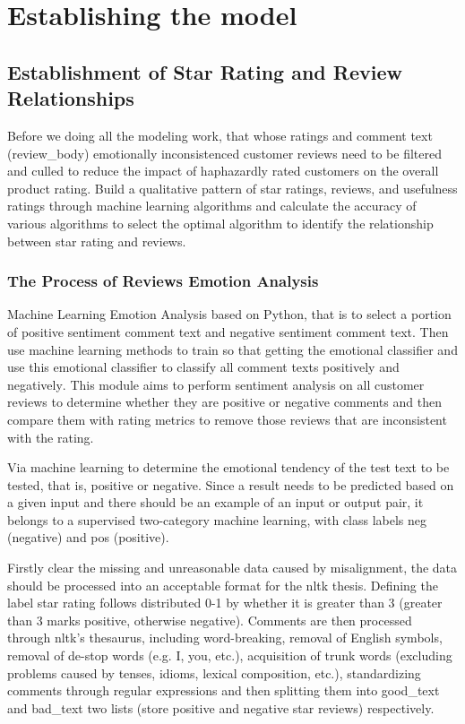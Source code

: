 \documentclass{mcmthesis}
\newcommand{\upcite}[1]{\textsuperscript{\textsuperscript{\cite{#1}}}}
\begin{document}
\section{Establishing the model}

\subsection{Establishment of Star Rating and Review Relationships}
Before we doing all the modeling work, that whose ratings and comment text (review\_body) emotionally inconsistenced customer reviews need to be filtered and culled to reduce the impact of haphazardly rated customers on the overall product rating. Build a qualitative pattern of star ratings, reviews, and usefulness ratings through machine learning algorithms and calculate the accuracy of various algorithms to select the optimal algorithm to identify the relationship between star rating and reviews.

\subsubsection{The Process of Reviews Emotion Analysis}
Machine Learning Emotion Analysis based on Python, that is to select a portion of positive sentiment comment text and negative sentiment comment text. Then use machine learning methods to train so that getting the emotional classifier and use this emotional classifier to classify all comment texts positively and negatively\upcite{1}. This module aims to perform sentiment analysis on all customer reviews to determine whether they are positive or negative comments and then compare them with rating metrics to remove those reviews that are inconsistent with the rating.

Via machine learning to determine the emotional tendency of the test text to be tested\upcite{2}, that is, positive or negative. Since a result needs to be predicted based on a given input and there should be an example of an input or output pair, it belongs to a supervised two-category machine learning, with class labels neg (negative) and pos (positive).

Firstly clear the missing and unreasonable data caused by misalignment\upcite{3}, the data should be processed into an acceptable format for the nltk thesis. Defining the label star rating follows distributed 0-1 by whether it is greater than 3 (greater than 3 marks positive, otherwise negative). Comments are then processed through nltk's thesaurus, including word-breaking, removal of English symbols, removal of de-stop words\upcite{4} (e.g. I, you, etc.), acquisition of trunk words (excluding problems caused by tenses, idioms, lexical composition, etc.), standardizing comments through regular expressions and then splitting them into good\_text and bad\_text two lists (store positive and negative star reviews) respectively.
\end{document}
